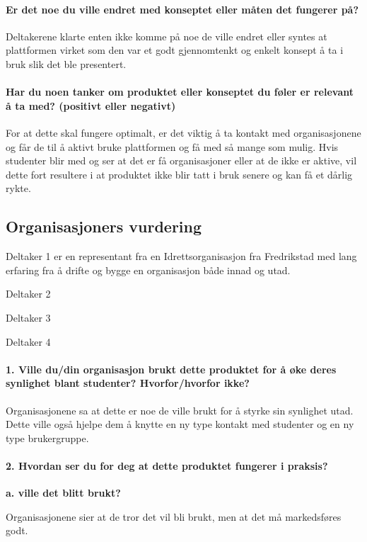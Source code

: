 \paragraph{Er det noe du ville endret med konseptet eller måten det fungerer på?} Deltakerene klarte enten ikke komme på noe de ville endret eller syntes at plattformen virket som den var et godt gjennomtenkt og enkelt konsept å ta i bruk slik det ble presentert.

\paragraph{Har du noen tanker om produktet eller konseptet du føler er relevant å ta med? (positivt eller negativt)}
For at dette skal fungere optimalt, er det viktig å ta kontakt med organisasjonene og får de til å aktivt bruke plattformen og få med så mange som mulig. Hvis studenter blir med og ser at det er få organisasjoner eller at de ikke er aktive, vil dette fort resultere i at produktet ikke blir tatt i bruk senere og kan få et dårlig rykte. 
\subsection{Organisasjoners vurdering}

Deltaker 1 er en representant fra en Idrettsorganisasjon fra Fredrikstad med lang erfaring fra å drifte og bygge en organisasjon både innad og utad.

Deltaker 2

Deltaker 3

Deltaker 4

\paragraph{1. Ville du/din organisasjon brukt dette produktet for å øke deres synlighet blant studenter? Hvorfor/hvorfor ikke?}
Organisasjonene sa at dette er noe de ville brukt for å styrke sin synlighet utad. Dette ville også hjelpe dem å knytte en ny type kontakt med studenter og en ny type brukergruppe.

\paragraph{2. Hvordan ser du for deg at dette produktet fungerer i praksis?}

{\bf a. ville det blitt brukt?}

Organisasjonene sier at de tror det vil bli brukt, men at det må markedsføres godt.

